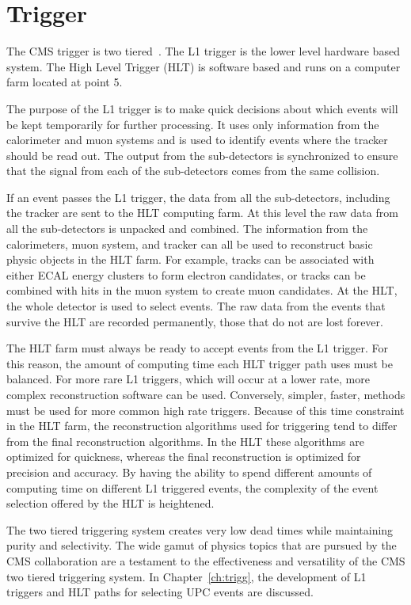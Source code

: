   \section{\label{sec:detTrg}Trigger}
    The CMS trigger is two tiered~\cite{Dasu:2000ge,Sphicas:2002gg}. 
    The L1 trigger is the lower level hardware based system. 
    The High Level Trigger (HLT) is software based and runs on a computer farm
      located at point 5.

    The purpose of the L1 trigger is to make quick decisions about which events
      will be kept temporarily for further processing.
    It uses only information from the calorimeter and muon systems and is used
      to identify events where the tracker should be read out.
    The output from the sub-detectors is synchronized to ensure that the signal
      from each of the sub-detectors comes from the same collision. 

    If an event passes the L1 trigger, the data from all the sub-detectors,
      including the tracker are sent to the HLT computing farm. 
    At this level the raw data from all the sub-detectors is unpacked and 
      combined.
    The information from the calorimeters, muon system, and tracker can all 
      be used to reconstruct basic physic objects in the HLT farm. 
    For example, tracks can be associated with either ECAL energy clusters to 
      form electron candidates, or tracks can be combined with hits in the muon
      system to create muon candidates.
    At the HLT, the whole detector is used to select events.
    The raw data from the events that survive the HLT are recorded permanently,
      those that do not are lost forever. 

    The HLT farm must always be ready to accept events from the L1 trigger.
    For this reason, the amount of computing time each HLT trigger path uses
      must be balanced.
    For more rare L1 triggers, which will occur at a lower rate, more 
      complex reconstruction software can be used.
    Conversely, simpler, faster, methods must be used for more common high
      rate triggers. 
    Because of this time constraint in the HLT farm, the reconstruction 
      algorithms used for triggering tend to differ from the final 
      reconstruction algorithms.
    In the HLT these algorithms are optimized for quickness, whereas the final 
      reconstruction is optimized for precision and accuracy.
    By having the ability to spend different amounts of computing time on 
      different L1 triggered events, the complexity of the event selection 
      offered by the HLT is heightened. 

    The two tiered triggering system creates very low dead times while 
      maintaining purity and selectivity.
    The wide gamut of physics topics that are pursued by the CMS collaboration
      are a testament to the effectiveness and versatility of the CMS two 
      tiered triggering system.
    In Chapter~\ref{ch:trigg}, the development of L1 triggers and HLT paths 
      for selecting UPC events are discussed. 
